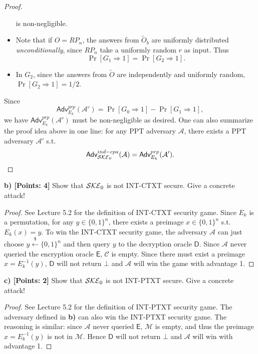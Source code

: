 \documentclass[12pt]{article}
\newcommand{\bits}{\{0,1\}}
\newcommand{\getsr}{\stackrel{\$}{\gets}}
\newcommand{\Adv}{\textsf{Adv}}
\newcommand{\M}{\mathcal{M}}
\newcommand{\C}{\mathcal{C}}
\theoremstyle{definition}
\newcommand{\A}{\mathcal{A}}
\begin{document}
\begin{proof}
\begin{itemize}
is non-negligible.
\item Note that if $O = RP_n$, the answers from $\widetilde{O}_b$ are uniformly distributed \emph{unconditionally}, since $RP_n$ take a uniformly random $r$ as input. Thus
$$\Pr[G_1 \Rightarrow 1] = \Pr[G_2 \Rightarrow 1].$$
\item In $G_2$, since the answers from $\widetilde{O}$ are independently and uniformly random, $\Pr[G_2 \Rightarrow 1] = 1/2$.
\end{itemize}
Since
$$\Adv_{E_k}^{prp}(\A') = \Pr[G_0 \Rightarrow 1] - \Pr[G_1 \Rightarrow 1],$$
we have $\Adv_{E_k}^{prp}(\A')$ must be non-negligible as desired. One can also summarize the proof idea above in one line: for any PPT adversary $\A$, there exists a PPT adversary $\A'$ s.t.
$$\Adv_{\SKE_0}^{ind-cpa}(\A) = \Adv_{E_k}^{prp}(\A').$$
\end{proof}

\newcommand{\E}{\mathsf{E}}
\newcommand{\D}{\mathsf{D}}
{\bf b) [Points: 4]} Show that $\mathcal{SKE}_0$ is not INT-CTXT secure. Give a concrete attack!
\begin{proof}
See Lecture 5.2 for the definition of INT-CTXT security game.
Since $E_k$ is a permutation, for any $y \in \bits^n$, there exists a preimage $x \in \bits^n$ s.t. $E_k(x) = y$.
To win the INT-CTXT security game, the adversary $\A$ can just choose $y \getsr \bits^n$ and then query $y$ to the decryption oracle $\D$. Since $\A$ never queried the encryption oracle $\E$, $\C$ is empty. Since there must exist a preimage $x = E_k^{-1}(y)$, $\D$ will not return $\bot$ and $\A$ will win the game with advantage 1. 
\end{proof}

{\bf c) [Points: 2]} Show that $\mathcal{SKE}_0$ is not INT-PTXT secure. Give a concrete attack!
\begin{proof}
See Lecture 5.2 for the definition of INT-PTXT security game.
The adversary defined in {\bf b)} can also win the INT-PTXT security game. The reasoning is similar: since $\A$ never queried $\E$, $\M$ is empty, and thus the preimage $x = E_k^{-1}(y)$ is not in $\M$. Hence $\D$ will not return $\bot$ and $\A$ will win with advantage 1.
\end{proof}
\end{document}
